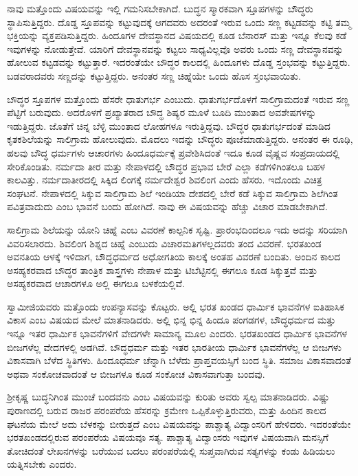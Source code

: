  ನಾವು ಮತ್ತೊಂದು ವಿಷಯವನ್ನು ಇಲ್ಲಿ ಗಮನಿಸಬೇಕಾಗಿದೆ. ಬುದ್ಧನ ಸ್ಮಾರಕವಾಗಿ ಸ್ತೂಪಗಳನ್ನು ಬೌದ್ಧರು ಸ್ಥಾಪಿಸುತ್ತಿದ್ದರು. ದೊಡ್ಡ ಸ್ತೂಪವನ್ನು ಕಟ್ಟುವುದಕ್ಕೆ ಆಗದವರು ಅದರಂತೆ ಇರುವ ಒಂದು ಸಣ್ಣ ಕಟ್ಟಡವನ್ನು ಕಟ್ಟಿ ತಮ್ಮ ಭಕ್ತಿಯನ್ನು ವ್ಯಕ್ತಪಡಿಸುತ್ತಿದ್ದರು. ಹಿಂದೂಗಳ ದೇವಸ್ಥಾನದ ವಿಷಯದಲ್ಲಿ ಕೂಡ ಬೆನಾರಸ್ ಮತ್ತು ಇನ್ನೂ ಕೆಲವು ಕಡೆ ಇವುಗಳನ್ನು ನೋಡುತ್ತೇವೆ. ಯಾರಿಗೆ ದೇವಸ್ಥಾನವನ್ನು ಕಟ್ಟಲು ಸಾಧ್ಯವಿಲ್ಲವೊ ಅವರು ಒಂದು ಸಣ್ಣ ದೇವಸ್ಥಾನವನ್ನು ಹೋಲುವ ಕಟ್ಟಡವನ್ನು ಕಟ್ಟುತ್ತಾರೆ. ಇದರಂತೆಯೇ ಬೌದ್ಧರ ಕಾಲದಲ್ಲಿ ಹಿಂದೂಗಳು ದೊಡ್ಡ ಸ್ತಂಭವನ್ನು ಕಟ್ಟುತ್ತಿದ್ದರು. ಬಡವರಾದವರು ಸಣ್ಣದನ್ನು ಕಟ್ಟುತ್ತಿದ್ದರು. ಅನಂತರ ಸಣ್ಣ ಚಿಹ್ನೆಯೇ ಒಂದು ಹೊಸ ಸ್ತಂಭವಾಯಿತು. 

 ಬೌದ್ಧರ ಸ್ತೂಪಗಳ ಮತ್ತೊಂದು ಹೆಸರೇ ಧಾತುಗರ್ಭ ಎಂಬುದು. ಧಾತುಗರ್ಭದೊಳಗೆ ಸಾಲಿಗ್ರಾಮದಂತೆ ಇರುವ ಸಣ್ಣ ಪೆಟ್ಟಿಗೆ ಬರುವುದು. ಅದರೊಳಗೆ ಪ್ರಖ್ಯಾತರಾದ ಬೌದ್ಧ ಶಿಷ್ಯರ ಮೂಳೆ ಬೂದಿ ಮುಂತಾದ ಅವಶೇಷಗಳನ್ನು ಇಡುತ್ತಿದ್ದರು. ಜೊತೆಗೆ ಚಿನ್ನ ಬೆಳ್ಳಿ ಮುಂತಾದ ಲೋಹಗಳೂ ಇರುತ್ತಿದ್ದವು. ಬೌದ್ಧರ ಧಾತುಗರ್ಭದಂತೆ ಮಾಡಿದ ಕೃತಕಶಿಲೆಯನ್ನು ಸಾಲಿಗ್ರಾಮ ಹೋಲುವುದು. ಮೊದಲು ಇದನ್ನು ಬೌದ್ಧರು ಪೂಜೆಮಾಡುತ್ತಿದ್ದರು. ಅನಂತರ ಈ ರೂಢಿ, ಹಲವು ಬೌದ್ಧ ಧರ್ಮಗಳು ಆಚಾರಗಳು ಹಿಂದೂಧರ್ಮಕ್ಕೆ ಪ್ರವೇಶಿಸಿದಂತೆ ಇದೂ ಕೂಡ ವೈಷ್ಣವ ಸಂಪ್ರದಾಯದಲ್ಲಿ ಸೇರಿಕೊಂಡಿತು. ನರ್ಮದಾ ತೀರ ಮತ್ತು ನೇಪಾಳದಲ್ಲಿ ಬೌದ್ಧರ ಪ್ರಭಾವ ಬೇರೆ ಎಲ್ಲಾ ಕಡೆಗಳಿಗಿಂತಲೂ ಬಹಳ ಕಾಲವಿತ್ತು. ನರ್ಮದಾತೀರದಲ್ಲಿ ಸಿಕ್ಕಿದ ಲಿಂಗಕ್ಕೆ ನರ್ಮದೇಶ್ವರ ಶಿವಲಿಂಗ ಎಂದು ಹೆಸರು. ಇದೊಂದು ವಿಚಿತ್ರ ಸಂಘಟನೆ. ನೇಪಾಳದಲ್ಲಿ ಸಿಕ್ಕುವ ಸಾಲಿಗ್ರಾಮ ಶಿಲೆ ಇಂಡಿಯಾ ದೇಶದಲ್ಲಿ ಬೇರೆ ಕಡೆ ಸಿಕ್ಕುವ ಸಾಲಿಗ್ರಾಮ ಶಿಲೆಗಿಂತ ಪವಿತ್ರವಾದುದು ಎಂಬ ಭಾವನೆ ಬಂದು ಹೋಗಿದೆ. ನಾವು ಈ ವಿಷಯವನ್ನು ಹೆಚ್ಚು ವಿಚಾರ ಮಾಡಬೇಕಾಗಿದೆ. 

 ಸಾಲಿಗ್ರಾಮ ಶಿಲೆಯನ್ನು ಯೋನಿ ಚಿಹ್ನೆ ಎಂಬ ವಿವರಣೆ ಕಾಲ್ಪನಿಕ ಸೃಷ್ಟಿ. ಪ್ರಾರಂಭದಿಂದಲೂ ಇದು ಅದನ್ನು ಸರಿಯಾಗಿ ವಿವರಿಸಲಾರದು. ಶಿವಲಿಂಗ ಶಿಶ್ನದ ಚಿಹ್ನೆ ಎಂಬುದು ವಿಚಾರಮತಿಗಳಲ್ಲದವರು ತಂದ ವಿವರಣೆ. ಭರತಖಂಡ ಅವನತಿಯ ಆಳಕ್ಕೆ ಇಳಿದಾಗ, ಬೌದ್ಧಧರ್ಮದ ಅಧೋಗತಿಯ ಕಾಲಕ್ಕೆ ಅಂತಹ ವಿವರಣೆ ಬಂದಿತು. ಅಂದಿನ ಕಾಲದ ಅಸಹ್ಯಕರವಾದ ಬೌದ್ಧರ ತಾಂತ್ರಿಕ ಶಾಸ್ತ್ರಗಳು ನೇಪಾಳ ಮತ್ತು ಟಿಬೆಟ್ಟಿನಲ್ಲಿ ಈಗಲೂ ಕೂಡ ಸಿಕ್ಕುತ್ತವೆ ಮತ್ತು ಅಸಹ್ಯಕರವಾದ ಆಚಾರಗಳೂ ಅಲ್ಲಿ ಈಗಲೂ ಬಳಕೆಯಲ್ಲಿವೆ. 

 ಸ್ವಾಮೀಜಿಯವರು ಮತ್ತೊಂದು ಉಪನ್ಯಾಸವನ್ನು ಕೊಟ್ಟರು. ಅಲ್ಲಿ ಭರತ ಖಂಡದ ಧಾರ್ಮಿಕ ಭಾವನೆಗಳ ಐತಿಹಾಸಿಕ ವಿಕಾಸ ಎಂಬ ವಿಷಯದ ಮೇಲೆ ಮಾತನಾಡಿದರು. ಅಲ್ಲಿ ಭಿನ್ನ ಭಿನ್ನ ಹಿಂದೂ ಪಂಗಡಗಳ, ಬೌದ್ಧಧರ್ಮದ ಮತ್ತು ಇನ್ನೂ ಇತರ ಧಾರ್ಮಿಕ ಭಾವನೆಗಳಿಗೆ ವೇದಗಳೇ ಸಾಮಾನ್ಯ ಮೂಲ ಎಂದರು. ಭರತಖಂಡದ ಧಾರ್ಮಿಕ ಭಾವನೆಗಳ ಬೀಜಗಳೆಲ್ಲ ವೇದಗಳಲ್ಲಿ ಅಡಗಿವೆ. ಬೌದ್ಧಧರ್ಮ ಮತ್ತು ಇತರ ಭಾರತೀಯ ಧಾರ್ಮಿಕ ಭಾವನೆಗಳೆಲ್ಲ ಆ ಬೀಜಗಳು ವಿಕಾಸವಾಗಿ ಬೆಳೆದ ಸ್ಥಿತಿಗಳು. ಹಿಂದೂಧರ್ಮ ಚೆನ್ನಾಗಿ ಬೆಳೆದು ಪ್ರಾಪ್ತವಯಸ್ಸಿಗೆ ಬಂದ ಸ್ಥಿತಿ. ಸಮಾಜ ವಿಕಾಸವಾದಂತೆ ಅಥವಾ ಸಂಕೋಚವಾದಂತೆ ಆ ಬೀಜಗಳೂ ಕೂಡ ಸಂಕೋಚ ವಿಕಾಸವಾಗುತ್ತಾ ಬಂದವು. 

 ಶ‍್ರೀಕೃಷ್ಣ ಬುದ್ಧನಿಗಿಂತ ಮುಂಚೆ ಬಂದವನು ಎಂಬ ವಿಷಯವನ್ನು ಕುರಿತು ಅವರು ಸ್ವಲ್ಪ ಮಾತನಾಡಿದರು. ವಿಷ್ಣು ಪುರಾಣದಲ್ಲಿ ಬರುವ ರಾಜರ ಪರಂಪರೆಯ ಹೆಸರನ್ನು ಕ್ರಮೇಣ ಒಪ್ಪಿಕೊಳ್ಳುತ್ತಿರುವರು, ಮತ್ತು ಹಿಂದಿನ ಕಾಲದ ಘಟನೆಯ ಮೇಲೆ ಅದು ಬೆಳಕನ್ನು ಬೀರುತ್ತದೆ ಎಂಬ ವಿಷಯವನ್ನು ಪಾಶ್ಚಾತ್ಯ ವಿದ್ವಾಂಸರಿಗೆ ಹೇಳಿದರು. ಇದರಂತೆಯೇ ಭರತಖಂಡದಲ್ಲಿರುವ ಪರಂಪರೆಯ ವಿಷಯವೂ ಸತ್ಯ. ಪಾಶ್ಚಾತ್ಯ ವಿದ್ವಾಂಸರು ಇವುಗಳ ವಿಷಯವಾಗಿ ಮನಸ್ಸಿಗೆ ತೋಚಿದಂತೆ ಲೇಖನಗಳನ್ನು ಬರೆಯುವ ಬದಲು ಪರಂಪರೆಯಲ್ಲಿ ಸುಪ್ತವಾಗಿರುವ ಸತ್ಯಗಳನ್ನು ಕಂಡು ಹಿಡಿಯಲು ಯತ್ನಿಸಬೇಕು ಎಂದರು. 

